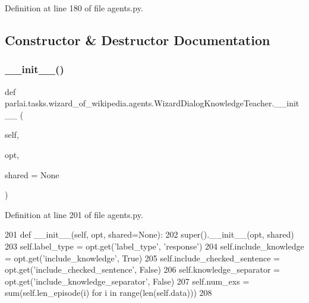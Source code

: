 Definition at line 180 of file agents.\+py.



\subsection{Constructor \& Destructor Documentation}
\mbox{\label{classparlai_1_1tasks_1_1wizard__of__wikipedia_1_1agents_1_1WizardDialogKnowledgeTeacher_a075ea712e50610abf78b8d976e0a460c}} 
\subsubsection{\texorpdfstring{\+\_\+\+\_\+init\+\_\+\+\_\+()}{\_\_init\_\_()}}
{\footnotesize\ttfamily def parlai.\+tasks.\+wizard\+\_\+of\+\_\+wikipedia.\+agents.\+Wizard\+Dialog\+Knowledge\+Teacher.\+\_\+\+\_\+init\+\_\+\+\_\+ (\begin{DoxyParamCaption}\item[{}]{self,  }\item[{}]{opt,  }\item[{}]{shared = {\ttfamily None} }\end{DoxyParamCaption})}



Definition at line 201 of file agents.\+py.


\begin{DoxyCode}
201     \textcolor{keyword}{def }\_\_init\_\_(self, opt, shared=None):
202         super().\_\_init\_\_(opt, shared)
203         self.label\_type = opt.get(\textcolor{stringliteral}{'label\_type'}, \textcolor{stringliteral}{'response'})
204         self.include\_knowledge = opt.get(\textcolor{stringliteral}{'include\_knowledge'}, \textcolor{keyword}{True})
205         self.include\_checked\_sentence = opt.get(\textcolor{stringliteral}{'include\_checked\_sentence'}, \textcolor{keyword}{False})
206         self.knowledge\_separator = opt.get(\textcolor{stringliteral}{'include\_knowledge\_separator'}, \textcolor{keyword}{False})
207         self.num\_exs = sum(self.len\_episode(i) \textcolor{keywordflow}{for} i \textcolor{keywordflow}{in} range(len(self.data)))
208 
\end{DoxyCode}


